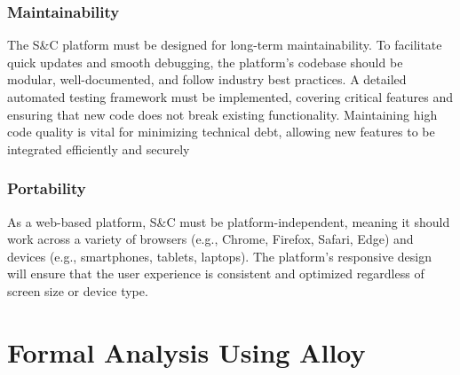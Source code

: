 \subsection{Maintainability}
The S\&C platform must be designed for long-term maintainability. To facilitate quick updates and smooth debugging, the platform’s codebase should be modular, well-documented, and follow industry best practices. A detailed automated testing framework must be implemented, covering critical features and ensuring that new code does not break existing functionality. Maintaining high code quality is vital for minimizing technical debt, allowing new features to be integrated efficiently and securely

\subsection{Portability}
As a web-based platform, S\&C must be platform-independent, meaning it should work across a variety of browsers (e.g., Chrome, Firefox, Safari, Edge) and devices (e.g., smartphones, tablets, laptops). The platform’s responsive design will ensure that the user experience is consistent and optimized regardless of screen size or device type.

\newpage

\chapter{Formal Analysis Using Alloy}
\label{Formal Analysis Using Alloy}

